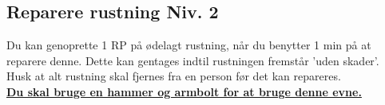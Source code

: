 \subsection{Reparere rustning Niv. 2}
Du kan genoprette 1 RP på ødelagt rustning, når du benytter 1 min på at reparere denne. Dette kan gentages indtil rustningen fremstår 'uden skader'.\\ 
Husk at alt rustning skal fjernes fra en person før det kan repareres.\\
\textbf{\underline{Du skal bruge en hammer og armbolt for at bruge denne evne.}}